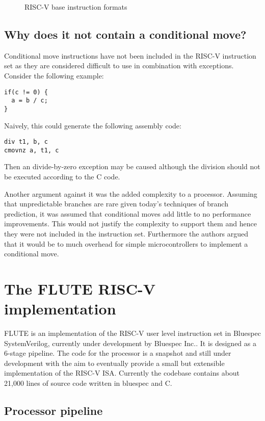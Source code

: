 \documentclass[12pt,twoside,notitlepage]{report}
\begin{document}
\begin{figure}[h]
\centering
\caption{RISC-V base instruction formats}
\end{figure}

\subsection{Why does it not contain a conditional move?}

Conditional move instructions have not been included in the RISC-V instruction set as they are considered difficult to use in combination with exceptions. Consider the following example:
\begin{verbatim}
if(c != 0) {
  a = b / c;
}
\end{verbatim}
Naively, this could generate the following assembly code:
\begin{verbatim}
div t1, b, c
cmovnz a, t1, c
\end{verbatim}
Then an divide-by-zero exception may be caused although the division should not be executed according to the C code.

Another argument against it was the added complexity to a processor. Assuming that unpredictable branches are rare given today’s techniques of branch prediction, it was assumed that conditional moves add little to no performance improvements\cite{RISCV_MAN}. This would not justify the complexity to support them and hence they were not included in the instruction set. Furthermore the authors argued that it would be to much overhead for simple microcontrollers to implement a conditional move.

\section{The FLUTE RISC-V implementation}

FLUTE is an implementation of the RISC-V user level instruction set in Bluespec SystemVerilog, currently under development by Bluespec Inc.. It is designed as a 6-stage pipeline. The code for the processor is a snapshot and still under development with the aim to eventually provide a small but extensible implementation of the RISC-V \gls{ISA}. Currently the codebase contains about 21,000 lines of source code written in bluespec and C.

\subsection{Processor pipeline}
\end{document}
